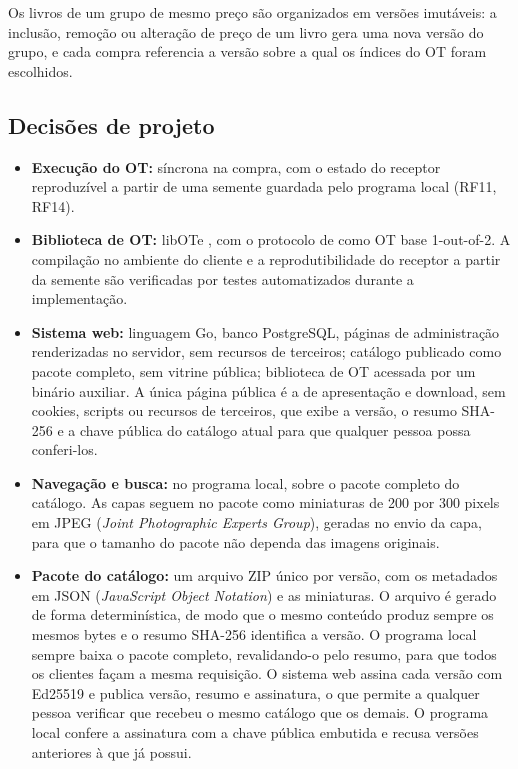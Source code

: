 Os livros de um grupo de mesmo preço são organizados em versões imutáveis: a
inclusão, remoção ou alteração de preço de um livro gera uma nova versão do
grupo, e cada compra referencia a versão sobre a qual os índices do OT foram
escolhidos.


\subsection{Decisões de projeto}

\begin{itemize}
\item \textbf{Execução do OT:} síncrona na compra, com o estado do receptor
reproduzível a partir de uma semente guardada pelo programa local (RF11,
RF14).

\item \textbf{Biblioteca de OT:} libOTe \cite{libote}, com o protocolo de
 como OT base 1-out-of-2. A compilação no ambiente
do cliente e a reprodutibilidade do receptor a partir da semente são
verificadas por testes automatizados durante a implementação.

\item \textbf{Sistema web:} linguagem Go, banco PostgreSQL, páginas de
administração renderizadas no servidor, sem recursos de terceiros; catálogo
publicado como pacote completo, sem vitrine pública; biblioteca de OT acessada
por um binário auxiliar. A única página pública é a de apresentação e
download, sem cookies, scripts ou recursos de terceiros, que exibe a versão,
o resumo SHA-256 e a chave pública do catálogo atual para que qualquer pessoa
possa conferi-los.

\item \textbf{Navegação e busca:} no programa local, sobre o pacote completo
do catálogo. As capas seguem no pacote como miniaturas de 200 por 300 pixels em
JPEG (\emph{Joint Photographic Experts Group}), geradas no envio da capa, para que o tamanho do pacote não dependa das
imagens originais.

\item \textbf{Pacote do catálogo:} um arquivo ZIP único por versão, com os
metadados em JSON (\emph{JavaScript Object Notation}) e as miniaturas. O arquivo é gerado de forma
determinística, de modo que o mesmo conteúdo produz sempre os mesmos bytes e o
resumo SHA-256 identifica a versão. O programa local sempre baixa o pacote
completo, revalidando-o pelo resumo, para que todos os clientes façam a mesma
requisição. O sistema web assina cada versão com Ed25519 e publica versão,
resumo e assinatura, o que permite a qualquer pessoa verificar que recebeu o
mesmo catálogo que os demais. O programa local confere a assinatura com a
chave pública embutida e recusa versões anteriores à que já possui.


\end{itemize}
